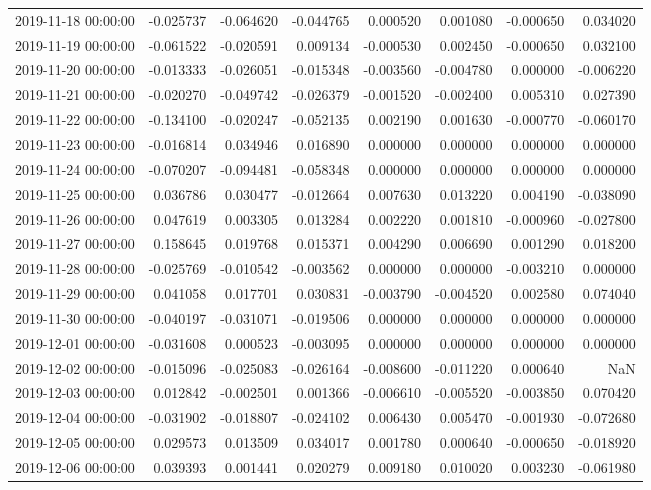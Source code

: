 \begin{tabular}{lrrrrrrr}
2019-11-18 00:00:00 & -0.025737 & -0.064620 & -0.044765 & 0.000520 & 0.001080 & -0.000650 & 0.034020 \\
2019-11-19 00:00:00 & -0.061522 & -0.020591 & 0.009134 & -0.000530 & 0.002450 & -0.000650 & 0.032100 \\
2019-11-20 00:00:00 & -0.013333 & -0.026051 & -0.015348 & -0.003560 & -0.004780 & 0.000000 & -0.006220 \\
2019-11-21 00:00:00 & -0.020270 & -0.049742 & -0.026379 & -0.001520 & -0.002400 & 0.005310 & 0.027390 \\
2019-11-22 00:00:00 & -0.134100 & -0.020247 & -0.052135 & 0.002190 & 0.001630 & -0.000770 & -0.060170 \\
2019-11-23 00:00:00 & -0.016814 & 0.034946 & 0.016890 & 0.000000 & 0.000000 & 0.000000 & 0.000000 \\
2019-11-24 00:00:00 & -0.070207 & -0.094481 & -0.058348 & 0.000000 & 0.000000 & 0.000000 & 0.000000 \\
2019-11-25 00:00:00 & 0.036786 & 0.030477 & -0.012664 & 0.007630 & 0.013220 & 0.004190 & -0.038090 \\
2019-11-26 00:00:00 & 0.047619 & 0.003305 & 0.013284 & 0.002220 & 0.001810 & -0.000960 & -0.027800 \\
2019-11-27 00:00:00 & 0.158645 & 0.019768 & 0.015371 & 0.004290 & 0.006690 & 0.001290 & 0.018200 \\
2019-11-28 00:00:00 & -0.025769 & -0.010542 & -0.003562 & 0.000000 & 0.000000 & -0.003210 & 0.000000 \\
2019-11-29 00:00:00 & 0.041058 & 0.017701 & 0.030831 & -0.003790 & -0.004520 & 0.002580 & 0.074040 \\
2019-11-30 00:00:00 & -0.040197 & -0.031071 & -0.019506 & 0.000000 & 0.000000 & 0.000000 & 0.000000 \\
2019-12-01 00:00:00 & -0.031608 & 0.000523 & -0.003095 & 0.000000 & 0.000000 & 0.000000 & 0.000000 \\
2019-12-02 00:00:00 & -0.015096 & -0.025083 & -0.026164 & -0.008600 & -0.011220 & 0.000640 & NaN \\
2019-12-03 00:00:00 & 0.012842 & -0.002501 & 0.001366 & -0.006610 & -0.005520 & -0.003850 & 0.070420 \\
2019-12-04 00:00:00 & -0.031902 & -0.018807 & -0.024102 & 0.006430 & 0.005470 & -0.001930 & -0.072680 \\
2019-12-05 00:00:00 & 0.029573 & 0.013509 & 0.034017 & 0.001780 & 0.000640 & -0.000650 & -0.018920 \\
2019-12-06 00:00:00 & 0.039393 & 0.001441 & 0.020279 & 0.009180 & 0.010020 & 0.003230 & -0.061980 \\

\end{tabular}
